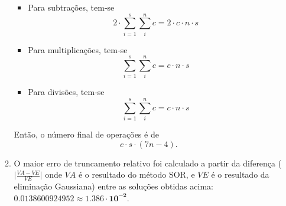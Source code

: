\documentclass{sftex/sftex}
\begin{document}
\begin{enumerate}
\begin{enumerate}
\begin{itemize}
\item Para subtrações, tem-se
\begin{equation*}
2 \cdot \sum_{i=1}^s \sum_{i}^n c = 2 \cdot c \cdot n \cdot s
\end{equation*}

\item Para multiplicações, tem-se
\begin{equation*}
\sum_{i=1}^s \sum_{i}^n c = c \cdot n \cdot s
\end{equation*}

\item Para divisões, tem-se
\begin{equation*}
\sum_{i=1}^s \sum_{i}^n c = c \cdot n \cdot s
\end{equation*}

\end{itemize}

Então, o número final de operações é de
\begin{equation*}
c \cdot s \cdot (7n - 4).
\end{equation*}

\item O maior erro de truncamento relativo foi calculado a partir da diferença
($\big\vert \frac{VA - VE}{VE} \big\vert$ onde $VA$ é o resultado do método SOR,
e $VE$ é o resultado da eliminação Gaussiana) entre as soluções obtidas acima:
$0.0138600924952 \approx \boldsymbol{1.386 \cdot 10^{-2}}$.

\end{enumerate}

\end{enumerate}
\end{document}
